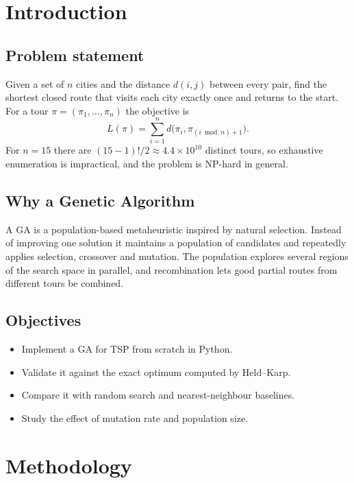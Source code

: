 \documentclass[11pt,a4paper]{article}
\begin{document}
\tableofcontents
\newpage

\section{Introduction}

\subsection{Problem statement}
Given a set of $n$ cities and the distance $d(i,j)$ between every pair, find the shortest closed route that
visits each city exactly once and returns to the start. For a tour $\pi=(\pi_1,\dots,\pi_n)$ the objective is
\[
  L(\pi)=\sum_{i=1}^{n} d\bigl(\pi_i,\pi_{(i \bmod n)+1}\bigr).
\]
For $n=15$ there are $(15-1)!/2\approx4.4\times10^{10}$ distinct tours, so exhaustive enumeration is impractical,
and the problem is NP-hard in general.

\subsection{Why a Genetic Algorithm}
A GA is a population-based metaheuristic inspired by natural selection. Instead of improving one solution it
maintains a population of candidates and repeatedly applies selection, crossover and mutation. The population
explores several regions of the search space in parallel, and recombination lets good partial routes from
different tours be combined.

\subsection{Objectives}
\begin{itemize}[nosep]
  \item Implement a GA for TSP from scratch in Python.
  \item Validate it against the exact optimum computed by Held--Karp.
  \item Compare it with random search and nearest-neighbour baselines.
  \item Study the effect of mutation rate and population size.
\end{itemize}

\section{Methodology}
\end{document}

